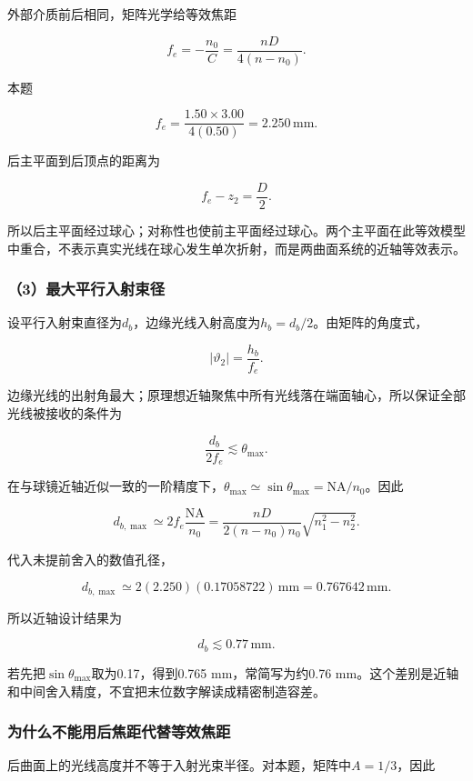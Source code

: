 \documentclass[12pt,a4paper,fontset=fandol]{ctexart}
\begin{document}
外部介质前后相同，矩阵光学给等效焦距

\[
\boxed{
f_e=-\frac{n_0}{C}
=\frac{nD}{4(n-n_0)}}.
\]

本题

\[
f_e=\frac{1.50\times3.00}{4(0.50)}
=2.250\,\mathrm{mm}.
\]

后主平面到后顶点的距离为

\[
f_e-z_2=\frac D2.
\]

所以后主平面经过球心；对称性也使前主平面经过球心。两个主平面在此等效模型中重合，不表示真实光线在球心发生单次折射，而是两曲面系统的近轴等效表示。

\subsubsection{（3）最大平行入射束径}\label{ux6700ux5927ux5e73ux884cux5165ux5c04ux675fux5f84}

设平行入射束直径为\(d_b\)，边缘光线入射高度为\(h_b=d_b/2\)。由矩阵的角度式，

\[
|\vartheta_2|=\frac{h_b}{f_e}.
\]

边缘光线的出射角最大；原理想近轴聚焦中所有光线落在端面轴心，所以保证全部光线被接收的条件为

\[
\frac{d_b}{2f_e}\lesssim\theta_{\max}.
\]

在与球镜近轴近似一致的一阶精度下，\(\theta_{\max}\simeq\sin\theta_{\max}=\mathrm{NA}/n_0\)。因此

\[
\boxed{
d_{b,\max}\simeq2f_e\frac{\mathrm{NA}}{n_0}
=\frac{nD}{2(n-n_0)n_0}
\sqrt{n_1^2-n_2^2}}.
\]

代入未提前舍入的数值孔径，

\[
d_{b,\max}\simeq
2(2.250)(0.17058722)\,\mathrm{mm}
=0.767642\,\mathrm{mm}.
\]

所以近轴设计结果为

\[
\boxed{d_b\lesssim0.77\,\mathrm{mm}}.
\]

若先把\(\sin\theta_{\max}\)取为0.17，得到0.765 mm，常简写为约0.76
mm。这个差别是近轴和中间舍入精度，不宜把末位数字解读成精密制造容差。

\subsubsection{为什么不能用后焦距代替等效焦距}\label{ux4e3aux4ec0ux4e48ux4e0dux80fdux7528ux540eux7126ux8dddux4ee3ux66ffux7b49ux6548ux7126ux8ddd}

后曲面上的光线高度并不等于入射光束半径。对本题，矩阵中\(A=1/3\)，因此
\end{document}
